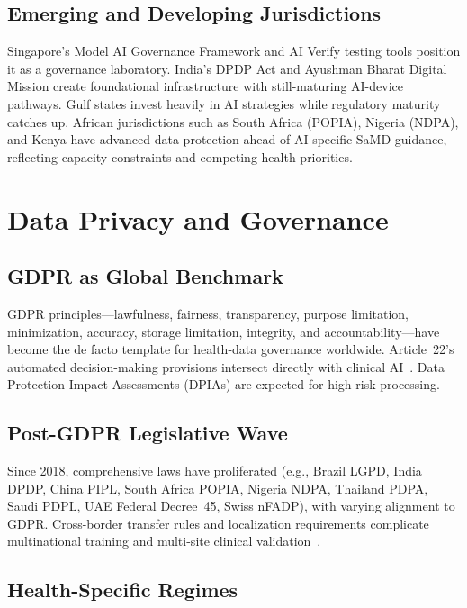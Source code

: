 \subsection{Emerging and Developing Jurisdictions}

Singapore's Model AI Governance Framework and AI Verify testing tools position it as a governance laboratory. India's DPDP Act and Ayushman Bharat Digital Mission create foundational infrastructure with still-maturing AI-device pathways. Gulf states invest heavily in AI strategies while regulatory maturity catches up. African jurisdictions such as South Africa (POPIA), Nigeria (NDPA), and Kenya have advanced data protection ahead of AI-specific SaMD guidance, reflecting capacity constraints and competing health priorities.

\section{Data Privacy and Governance}
\label{sec:privacy}

\subsection{GDPR as Global Benchmark}

GDPR principles---lawfulness, fairness, transparency, purpose limitation, minimization, accuracy, storage limitation, integrity, and accountability---have become the de facto template for health-data governance worldwide. Article~22's automated decision-making provisions intersect directly with clinical AI~\cite{goodman2017}. Data Protection Impact Assessments (DPIAs) are expected for high-risk processing.

\subsection{Post-GDPR Legislative Wave}

Since 2018, comprehensive laws have proliferated (e.g., Brazil LGPD, India DPDP, China PIPL, South Africa POPIA, Nigeria NDPA, Thailand PDPA, Saudi PDPL, UAE Federal Decree~45, Swiss nFADP), with varying alignment to GDPR. Cross-border transfer rules and localization requirements complicate multinational training and multi-site clinical validation~\cite{gerke2020}.

\subsection{Health-Specific Regimes}

